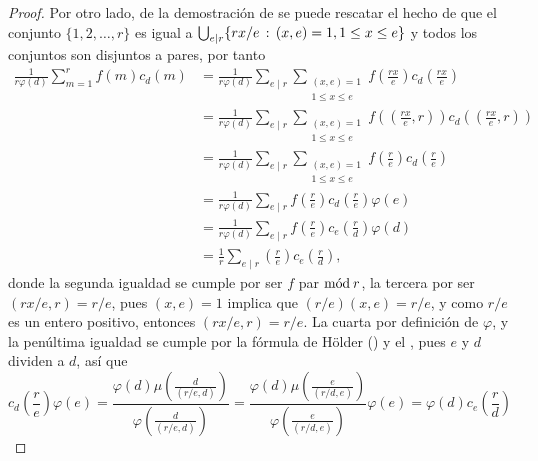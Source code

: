 \begin{proof}
Por otro lado, de la demostración de  se puede rescatar el hecho de que el conjunto $\{ 1,2,\ldots,r \}$ es igual a $\bigcup_{e \mid r} \{ rx/e \, : \, (x,e)=1, 1 \le x \le e \}$ y todos los conjuntos son disjuntos a pares, por tanto
\begin{equation*}
\begin{split}
    \frac{1}{r \varphi(d)}\sum_{m=1}^{r} f(m) c_d(m) &= \frac{1}{r \varphi(d)}\sum_{e \mid r} \sum_{\substack{(x,e)=1 \\ 1 \le x \le e}} f \left( \frac{rx}{e} \right) c_d \left( \frac{rx}{e} \right) \\
                               &= \frac{1}{r \varphi(d)}\sum_{e \mid r} \sum_{\substack{(x,e)=1 \\ 1 \le x \le e}} f \left( \left( \frac{rx}{e},r \right) \right) c_d \left( \left( \frac{rx}{e},r \right) \right) \\
                               &= \frac{1}{r \varphi(d)}\sum_{e \mid r} \sum_{\substack{(x,e)=1 \\ 1 \le x \le e}} f \left( \frac{r}{e} \right) c_d \left( \frac{r}{e} \right) \\
                               &= \frac{1}{r \varphi(d)}\sum_{e \mid r} f \left( \frac{r}{e} \right) c_d \left( \frac{r}{e} \right) \varphi(e) \\
                               &= \frac{1}{r \varphi(d)}\sum_{e \mid r} f \left( \frac{r}{e} \right) c_e \left( \frac{r}{d} \right) \varphi(d) \\
                               &= \frac{1}{r}\sum_{e \mid r} \left( \frac{r}{e} \right) c_e \left( \frac{r}{d} \right),
\end{split}
\end{equation*}
donde la segunda igualdad se cumple por ser $f$ par $\mathrm{m\acute{o}d\:}r$, la tercera por ser $(rx/e,r)=r/e$, pues $(x,e)=1$ implica que $(r/e)(x,e)=r/e$, y como $r/e$ es un entero positivo, entonces $(rx/e,r)=r/e$. La cuarta por definición de $\varphi$, y la penúltima igualdad se cumple por la fórmula de Hölder () y el , pues $e$ y $d$ dividen a $d$, así que
\begin{equation}\label{eq:holder}
    c_d \left( \frac{r}{e} \right) \varphi(e) = \frac{\varphi(d)\mu \left( \displaystyle \frac{d}{(r/e,d)} \right)}{\varphi \left( \displaystyle \frac{d}{(r/e,d)} \right)} = \frac{\varphi(d)\mu \left( \displaystyle \frac{e}{(r/d,e)} \right)}{\varphi \left( \displaystyle \frac{e}{(r/d,e)} \right)} \varphi(e) = \varphi(d) c_e \left( \frac{r}{d} \right)
\end{equation}
\end{proof}

